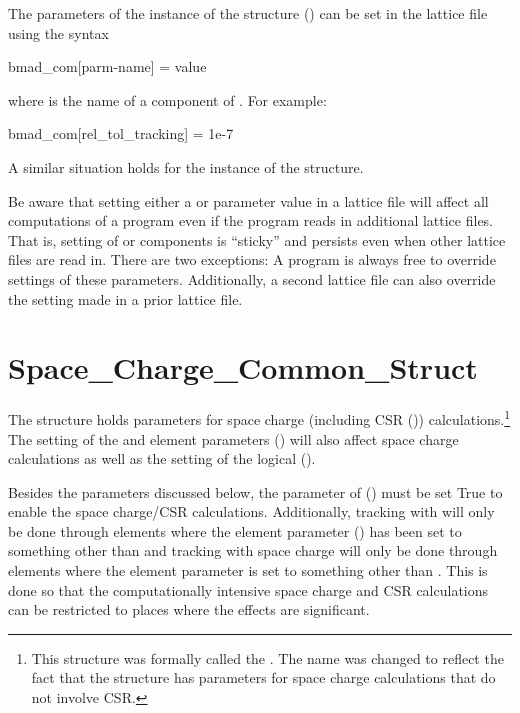 {The parameters of the  instance of the  structure
() can be set in the lattice file using the syntax
\begin{example}
  bmad_com[parm-name] = value
\end{example}
where  is the name of a component of
. For example:
\begin{example}
  bmad_com[rel_tol_tracking] = 1e-7
\end{example}

A similar situation holds for the  instance of the  structure.

Be aware that setting either a  or  parameter value in a lattice file will
affect all computations of a program even if the program reads in additional lattice files. That is,
setting of  or  components is ``sticky'' and persists even when other
lattice files are read in. There are two exceptions: A program is always free to override settings
of these parameters.  Additionally, a second lattice file can also override the setting made in a
prior lattice file.

\section{Space_Charge_Common_Struct}
\label{s:sc.com}

The  structure holds parameters for space charge (including CSR
()) calculations.\footnote
  {
This structure was formally called the . The name was changed to reflect
the fact that the structure has parameters for space charge calculations that do not involve CSR.
  }
The setting of the  and  element parameters
() will also affect space charge calculations as well as the setting of the
 logical  ().

Besides the parameters discussed below, the  parameter of 
() must be set True to enable the space charge/CSR calculations. Additionally,
tracking with  will only be done through elements where the element parameter
 () has been set to something other than  and tracking with
space charge will only be done through elements where the element parameter 
is set to something other than . This is done so that the computationally intensive space
charge and CSR calculations can be restricted to places where the effects are significant.

}
